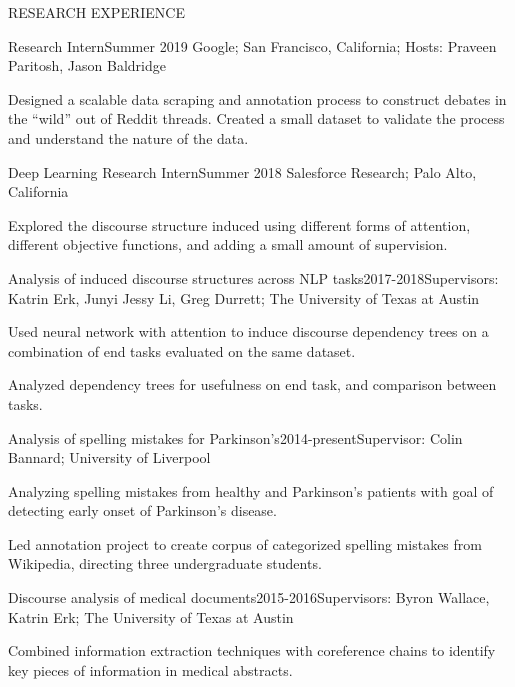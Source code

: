 \documentclass{resume} %
\begin{document}

\begin{rSection}{RESEARCH EXPERIENCE} 
\vspace{-0.3em}
\begin{rSubsection}{Research Intern}{Summer 2019} {Google; San Francisco, California; Hosts: Praveen Paritosh, Jason Baldridge} {}
\item Designed a scalable data scraping and annotation process to construct debates in the ``wild'' out of Reddit threads. Created a small dataset to validate the process and understand the nature of the data.
\end{rSubsection}

\begin{rSubsection}{Deep Learning Research Intern}{Summer 2018} {Salesforce Research; Palo Alto, California} {}
\item Explored the discourse structure induced using different forms of attention, different objective functions, and adding a small amount of supervision.
\end{rSubsection}

\begin{rSubsection}{Analysis of induced discourse structures across NLP tasks}{2017-2018}{Supervisors: Katrin Erk, Junyi Jessy Li, Greg Durrett; The University of Texas at Austin}{}
\item Used neural network with attention to induce discourse dependency trees on a combination of end tasks evaluated on the same dataset.
\item Analyzed dependency trees for usefulness on end task, and comparison between tasks.
\end{rSubsection}

\begin{rSubsection}{Analysis of spelling mistakes for Parkinson's}{2014-present}{Supervisor: Colin Bannard; University of Liverpool}{}
\item Analyzing spelling mistakes from healthy and Parkinson's patients with goal of detecting early onset of Parkinson's disease.
\item Led annotation project to create corpus of categorized spelling mistakes from Wikipedia, directing three undergraduate students.
\end{rSubsection}

\begin{rSubsection}{Discourse analysis of medical documents}{2015-2016}{Supervisors: Byron Wallace, Katrin Erk; The University of Texas at Austin}{}
\item Combined information extraction techniques with coreference chains to identify key pieces of information in medical abstracts.
\end{rSubsection}


\end{rSection}
\end{document}
